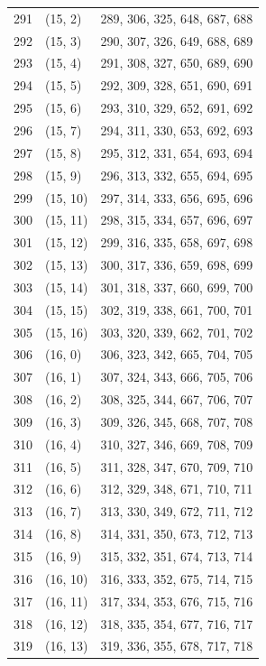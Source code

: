 \documentclass{article}
\begin{document}
\begin{longtable}{lll}
  291 & (15, 2) & 289, 306, 325, 648, 687, 688 \\
  292 & (15, 3) & 290, 307, 326, 649, 688, 689 \\
  293 & (15, 4) & 291, 308, 327, 650, 689, 690 \\
  294 & (15, 5) & 292, 309, 328, 651, 690, 691 \\
  295 & (15, 6) & 293, 310, 329, 652, 691, 692 \\
  296 & (15, 7) & 294, 311, 330, 653, 692, 693 \\
  297 & (15, 8) & 295, 312, 331, 654, 693, 694 \\
  298 & (15, 9) & 296, 313, 332, 655, 694, 695 \\
  299 & (15, 10) & 297, 314, 333, 656, 695, 696 \\
  300 & (15, 11) & 298, 315, 334, 657, 696, 697 \\
  301 & (15, 12) & 299, 316, 335, 658, 697, 698 \\
  302 & (15, 13) & 300, 317, 336, 659, 698, 699 \\
  303 & (15, 14) & 301, 318, 337, 660, 699, 700 \\
  304 & (15, 15) & 302, 319, 338, 661, 700, 701 \\
  305 & (15, 16) & 303, 320, 339, 662, 701, 702 \\
  306 & (16, 0) & 306, 323, 342, 665, 704, 705 \\
  307 & (16, 1) & 307, 324, 343, 666, 705, 706 \\
  308 & (16, 2) & 308, 325, 344, 667, 706, 707 \\
  309 & (16, 3) & 309, 326, 345, 668, 707, 708 \\
  310 & (16, 4) & 310, 327, 346, 669, 708, 709 \\
  311 & (16, 5) & 311, 328, 347, 670, 709, 710 \\
  312 & (16, 6) & 312, 329, 348, 671, 710, 711 \\
  313 & (16, 7) & 313, 330, 349, 672, 711, 712 \\
  314 & (16, 8) & 314, 331, 350, 673, 712, 713 \\
  315 & (16, 9) & 315, 332, 351, 674, 713, 714 \\
  316 & (16, 10) & 316, 333, 352, 675, 714, 715 \\
  317 & (16, 11) & 317, 334, 353, 676, 715, 716 \\
  318 & (16, 12) & 318, 335, 354, 677, 716, 717 \\
  319 & (16, 13) & 319, 336, 355, 678, 717, 718 \\

\end{longtable}
\end{document}

